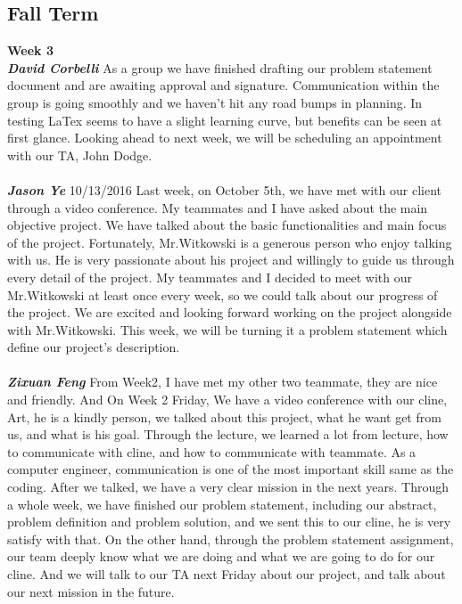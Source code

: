 \documentclass[onecolumn, draftclsnofoot,10pt, compsoc]{IEEEtran}
\begin{document}
\subsection{Fall Term}
\textbf{Week 3}
\\ \textbf{\textit{David Corbelli}}
\noindent As a group we have finished drafting our problem statement document and are awaiting approval and signature. Communication within the group is going smoothly and we haven't hit any road bumps in planning. In testing LaTex seems to have a slight learning curve, but benefits can be seen at first glance. Looking ahead to next week, we will be scheduling an appointment with our TA, John Dodge.
\\ \\
\textbf{\textit{Jason Ye}}
10/13/2016 Last week, on October 5th, we have met with our client through a video conference. My teammates and I have asked about the main objective project. We have talked about the basic functionalities and main focus of the project. Fortunately, Mr.Witkowski is a generous person who enjoy talking with us. He is very passionate about his project and willingly to guide us through every detail of the project. My teammates and I decided to meet with our Mr.Witkowski at least once every week, so we could talk about our progress of the project. We are excited and looking forward working on the project alongside with Mr.Witkowski. This week, we will be turning it a problem statement which define our project's description.\\ \\
\textbf{\textit{Zixuan Feng}}
From Week2, I have met my other two teammate, they are nice and friendly. And On Week 2 Friday, We have a video conference with our cline, Art, he is a kindly person, we talked about this project, what he want get from us, and what is his goal. Through the lecture, we learned a lot from lecture, how to communicate with cline, and how to communicate with teammate. As a computer engineer, communication is one of the most important skill same as the coding. After we talked, we have a very clear mission in the next years. Through a whole week, we have finished our problem statement, including our abstract, problem definition and problem solution, and we sent this to our cline, he is very satisfy with that. On the other hand, through the problem statement assignment, our team deeply know what we are doing and what we are going to do for our cline. And we will talk to our TA next Friday about our project, and talk about our next mission in the future.\\ \\
\end{document}
